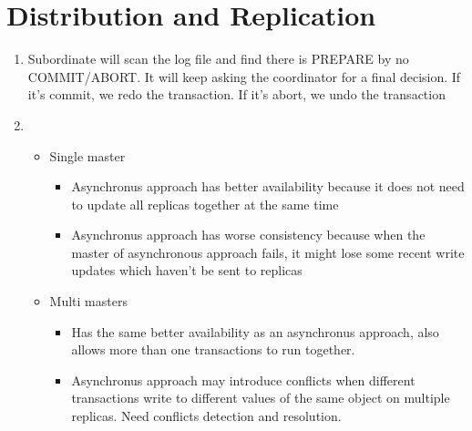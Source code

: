 \documentclass[10pt]{myland}
\begin{document}
\section{Distribution and Replication}
\begin{enumerate}
    \item Subordinate will scan the log file and find there is PREPARE by no COMMIT/ABORT. It will keep asking the
        coordinator for a final decision. If it's commit, we redo the transaction. If it's abort, we undo the transaction
    \item
        \begin{itemize}
            \item Single master
                \begin{itemize}
                    \item Asynchronus approach has better availability because it does not need to update all replicas
                        together at the same time
                    \item Asynchronus approach has worse consistency because when the master of asynchronous approach
                        fails, it might lose some recent write updates which haven't be sent to replicas
                \end{itemize}
            \item Multi masters
                \begin{itemize}
                    \item Has the same better availability as an asynchronus approach, also allows more than one
                        transactions to run together.
                    \item Asynchronus approach may introduce conflicts when different transactions write to different
                        values of the same object on multiple replicas. Need conflicts detection and resolution.
                \end{itemize}
        \end{itemize}
\end{enumerate}
\end{document}
